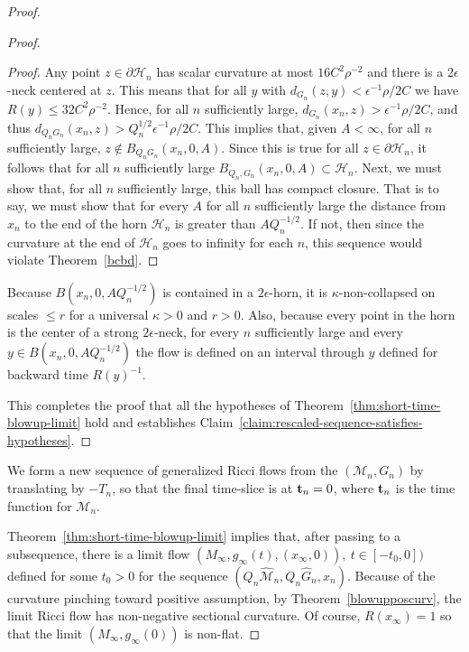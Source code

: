 \begin{proof}
\begin{proof}
\begin{proof}
Any point  $z\in\partial {\mathcal H}_n$ has scalar curvature at
most $16C^2\rho^{-2}$ and there is a $2\epsilon$-neck centered at
$z$. This means that for all $y$ with
$d_{G_n}(z,y)<\epsilon^{-1}\rho/2C$ we have $R(y)\le
32C^2\rho^{-2}$. Hence, for all $n$ sufficiently large,
$d_{G_n}(x_n,z)>\epsilon^{-1}\rho/2C$, and thus
$d_{Q_nG_n}(x_n,z)>Q^{1/2}_n\epsilon^{-1}\rho/2C$. This implies
that, given $A<\infty$, for all $n$ sufficiently large, $z\not\in
B_{Q_nG_n}(x_n,0,A)$. Since this is true for all $z\in \partial
{\mathcal H}_n$, it follows that for all $n$ sufficiently large
$B_{Q_n,G_n}(x_n,0,A)\subset {\mathcal H}_n$. Next, we must show
that, for all $n$ sufficiently large, this ball has compact closure.
That is to say, we must show that for every $A$ for all $n$
sufficiently large the distance from $x_n$ to the end of the horn
${\mathcal H}_n$ is greater than $AQ_n^{-1/2}$. If not, then since
the curvature at the end of ${\mathcal H}_n$ goes to infinity for
each $n$, this sequence would violate Theorem~\ref{bcbd}.
\end{proof}

Because $B(x_n,0,AQ_n^{-1/2})$ is contained in a $2\epsilon$-horn,
it is $\kappa$-non-collapsed on scales $\le r$ for a universal
$\kappa>0$ and $r>0$. Also, because every point in the horn is the
center of a strong $2\epsilon$-neck, for every $n$ sufficiently
large and every $y\in B(x_n,0,AQ_n^{-1/2})$ the flow is defined on
an interval through $y$ defined for backward time $R(y)^{-1}$.


This completes the proof that all the hypotheses of
Theorem~\ref{thm:short-time-blowup-limit} hold and establishes Claim~\ref{claim:rescaled-sequence-satisfies-hypotheses}.
\end{proof}



We form a new sequence of generalized Ricci flows from the
$({\mathcal M}_n, G_n)$ by translating by $-T_n$, so that the final
time-slice is at ${\bf t}_n=0$, where ${\bf t}_n$ is the time
function for ${\mathcal M}_n$.







Theorem~\ref{thm:short-time-blowup-limit} implies that, after passing to a
subsequence, there is a limit flow
$(M_\infty,g_\infty(t),(x_\infty,0)),\ t\in[-t_0,0])$ defined for
some $t_0>0$ for the  sequence $(Q_n\widehat{\mathcal
M}_n,Q_n\widehat G_n,x_n)$. Because of the curvature pinching toward
positive assumption, by Theorem~\ref{blowupposcurv}, the limit Ricci
flow has non-negative sectional curvature. Of course,
$R(x_\infty)=1$ so that the limit $(M_\infty,g_\infty(0))$ is
non-flat.


\end{proof}
